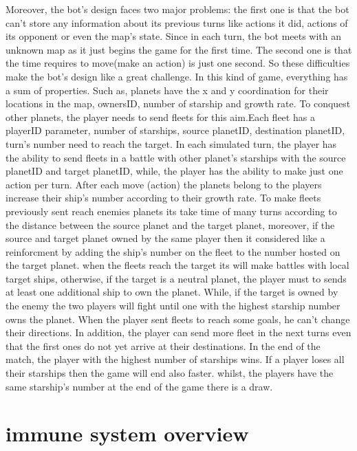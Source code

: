 \documentclass[conference]{IEEEtran}
\begin{document}
Moreover, the bot's design faces two major problems: the first one \cite{doc1}is that the bot can't store any information about its previous turns like actions it did, actions of its opponent or even the map's state. Since in each turn, the bot meets with an unknown map as it just begins the game for the first time. The second one\cite{doc3} is that the time requires to move(make an action) is just one second. So these difficulties make the bot's design like a great challenge. In this kind of game, everything has a sum of properties\cite{doc1}. Such as, planets have the x and y coordination for their locations in the map, ownersID, number of starship and growth rate. To conquest other planets, the player needs to send fleets for this aim.Each fleet has a playerID parameter, number of starships, source planetID, destination planetID, turn's number need to reach the target. In each simulated turn\cite{doc1}, the player has the ability to send fleets in a battle with other planet's starships with the source planetID and target planetID, while, the player has the ability\cite{doc1} to make just one action per turn. After each move (action) the planets belong to the players\cite{doc5} increase their ship's number according to their growth rate. To make fleets previously sent reach enemies planets its take time of many turns according to the distance between the source planet and the target planet, moreover, if the source and target planet owned by the same player then it considered like a reinforcment\cite{doc1,doc5} by adding the ship's number on the fleet to the number hosted on the target planet. when the fleets reach the target its will make battles with local target ships, otherwise, if the target is a neutral planet, the player must to sends at least one additional ship to own the planet. While, if the target is owned by the enemy the two players will fight until one with the highest starship number owns the planet. When the player sent fleets to reach some goals\cite{doc5}, he can't change their directions. In addition, the player can send more fleet in the next turns even that the first ones do not yet arrive at their destinations. In the end of the match\cite{doc5}, the player with the highest number of starships wins. If a player loses all their starships then the game will end also faster. whilst, the players have the same starship's number at the end of the game there is a draw\cite{doc5}. 
\section{immune system overview}
\end{document}
